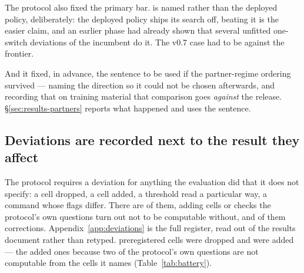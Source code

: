 The protocol also fixed the primary bar. \fcheap{} is named rather than the deployed policy,
deliberately: the deployed policy ships its search off, beating it is the easier claim, and an
earlier phase had already shown that several unfitted one-switch deviations of the incumbent do it.
The v0.7 case had to be against the frontier.

And it fixed, in advance, the sentence to be used if the partner-regime ordering survived --- naming
the direction so it could not be chosen afterwards, and recording that on training material that
comparison goes \emph{against} the release. \S\ref{sec:results-partners} reports what happened and
uses the sentence.

\subsection{Deviations are recorded next to the result they affect}
\label{sec:protocol-deviations}

The protocol requires a deviation for anything the evaluation did that it does not specify: a cell
dropped, a cell added, a threshold read a particular way, a command whose flags differ. There are
\vsevenDeviations{} of them, \vsevenDeviationAdded{} adding cells or checks the protocol's own
questions turn out not to be computable without, and \vsevenDeviationCorrections{} of them
corrections. Appendix~\ref{app:deviations} is the full register, read out of the results
document rather than retyped. \vsevenCellsDropped{} preregistered cells were dropped and
\vsevenCellsAdded{} were added --- the added ones because two of the protocol's own questions are not
computable from the cells it names (Table~\ref{tab:battery}).
